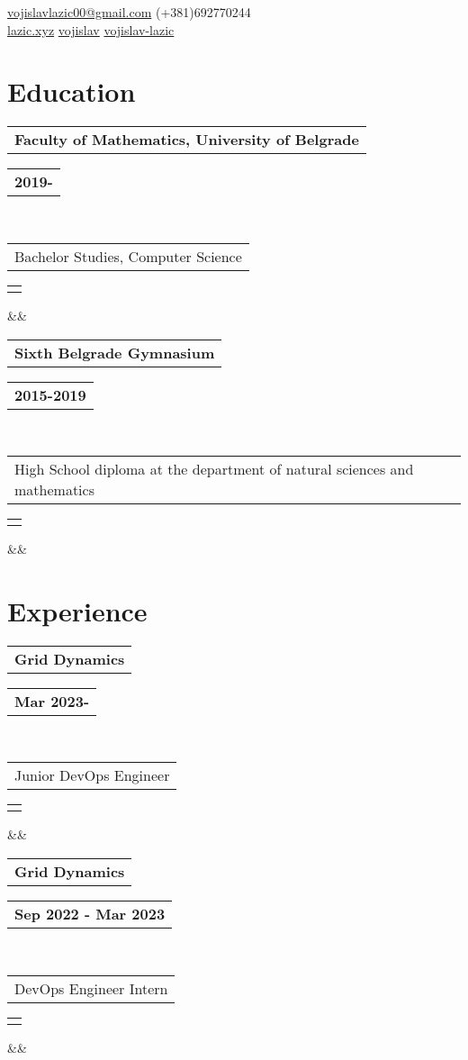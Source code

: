 \documentclass[11pt,a4paper,roman]{moderncv}        %
\makeatletter
\newcommand*{\customcventry}[7][.25em]{
  \begin{tabular}{@{}l}
    {\bfseries #4}
  \end{tabular}
  \hfill%
  \begin{tabular}{l@{}}
     {\bfseries #5}
  \end{tabular} \\
  \begin{tabular}{@{}l}
    {#3}
  \end{tabular}
  \hfill%
  \begin{tabular}{l@{}}
     {\itshape #2}
  \end{tabular}
  \ifx&#7&%
  \else{\\%
    \begin{minipage}{\maincolumnwidth}%
      \small#7%
    \end{minipage}}\fi%
  \par\addvspace{#1}}
\makeatother
\begin{document}
\makecvtitle
\vspace*{-17mm}

\begin{center}
	\faEnvelopeO\enspace \href{mail:vojislavlazic00@gmail.com}{vojislavlazic00@gmail.com} \enspace \faMobile\enspace (+381)692770244 \\
	\faGlobe\enspace \href{https://lazic.xyz}{lazic.xyz} \enspace
	\faGithub\enspace \href{https://github.com/vojislav}{vojislav} \enspace
	\faLinkedinSquare\enspace \href{https://www.linkedin.com/in/vojislav-lazic/}{vojislav-lazic}
\end{center}

\section{Education}
{\customcventry{}{Bachelor Studies, Computer Science}{Faculty of Mathematics, University of Belgrade}{2019-}{}{}}
{\customcventry{}{High School diploma at the department of natural sciences and mathematics}{Sixth Belgrade Gymnasium}{2015-2019}{}{}}


\section{Experience}
{\customcventry{}{Junior DevOps Engineer}{Grid Dynamics}{Mar 2023-}{}{}}
{\customcventry{}{DevOps Engineer Intern}{Grid Dynamics}{Sep 2022 - Mar 2023}{}{}}
\end{document}
